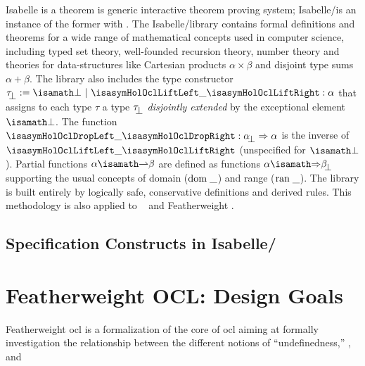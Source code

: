 Isabelle is a theorem is generic interactive theorem proving system;
Isabelle/\HOL is an instance of the former with \HOL.  The
Isabelle/\HOL library contains formal definitions and theorems for a
wide range of mathematical concepts used in computer science,
including typed set theory, well-founded recursion theory, number
theory and theories for data-structures like Cartesian products
$\alpha \times \beta$ and disjoint type sums $\alpha + \beta$.  The
library also includes the type constructor $\up{\tau} := \isasymbottom
~ | ~ \lift{\_} : \alpha$ that assigns to each type $\tau$ a type
$\up{\tau}$ \emph{disjointly extended} by the exceptional element
$\isasymbottom$. The function $\drop{\_}
: \up{\alpha} \to \alpha$ is the inverse of $\lift{\_}$ (unspecified
for $\isasymbottom$). Partial functions $\alpha \isasymrightharpoonup
\beta$ are defined as functions $\alpha \isasymRightarrow \up{\beta}$
supporting the usual concepts of domain ($\mathrm{dom}\;\_$) and range
($\mathrm{ran}\;\_$).  The library is built entirely by logically safe,
conservative definitions and derived rules.  This methodology is also
applied to \holocl~\cite{brucker.ea:hol-ocl:2008} and Featherweight
\OCL.

\subsection{Specification Constructs in Isabelle/\HOL}\label{sec:spec-constructs}


\section{Featherweight OCL: Design Goals}
Featherweight \acs{ocl} is a formalization of the core of \acs{ocl}
aiming at formally investigation the relationship between the
different notions of ``undefinedness,'' \ie,  and

